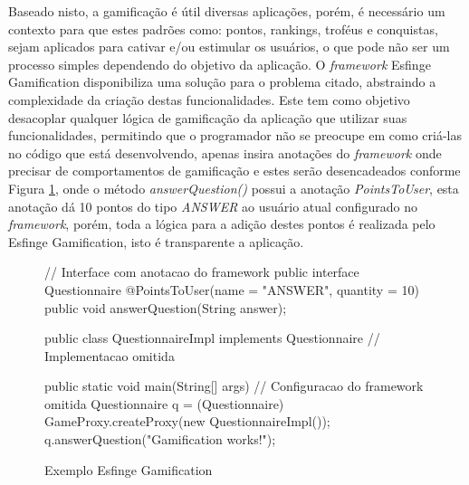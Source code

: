 \par Baseado nisto, a gamificação é útil diversas aplicações, porém, é necessário um contexto para que estes padrões como: pontos, rankings, troféus e conquistas, sejam aplicados para cativar e/ou estimular os usuários, o que pode não ser um processo simples dependendo do objetivo da aplicação. O \textit{framework} Esfinge Gamification disponibiliza uma solução para o problema citado, abstraindo a complexidade da criação destas funcionalidades. Este tem como objetivo desacoplar qualquer lógica de gamificação da aplicação que utilizar suas funcionalidades, permitindo que o programador não se preocupe em como criá-las no código que está desenvolvendo, apenas insira anotações do \textit{framework} onde precisar de comportamentos de gamificação  e estes serão desencadeados conforme Figura \ref{fig:esfingesample}, onde o método \textit{answerQuestion()} possui a anotação \textit{PointsToUser}, esta anotação dá 10 pontos do tipo \textit{ANSWER} ao usuário atual configurado no \textit{framework}, porém, toda a lógica para a adição destes pontos é realizada pelo Esfinge Gamification, isto é transparente a aplicação.

\begin{figure}[H]
    \centering
    \begin{java}

// Interface com anotacao do framework
public interface Questionnaire {
    @PointsToUser(name = "ANSWER", quantity = 10)
    public void answerQuestion(String answer);
}

public class QuestionnaireImpl implements Questionnaire {
    // Implementacao omitida
}

public static void main(String[] args) {
    // Configuracao do framework omitida
    Questionnaire q = (Questionnaire) GameProxy.createProxy(new QuestionnaireImpl());
    q.answerQuestion("Gamification works!");
}
\end{java}
    \caption{Exemplo Esfinge Gamification}
    \label{fig:esfingesample}
\end{figure}

